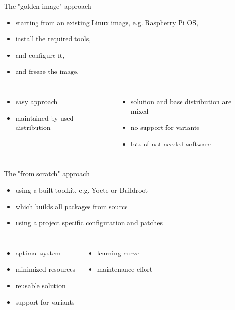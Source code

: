 \documentclass{beamer}
\newcommand\pro{\item[$+$]}
\newcommand\con{\item[$-$]}
\begin{document}
\begin{frame}{The "golden image" approach}
	\begin{itemize}
		\item starting from an existing Linux image, e.g. Raspberry Pi OS,
		\item install the required tools,
		\item and configure it,
		\item and freeze the image.
	\end{itemize}

	\begin{columns}
        \centering
        \begin{itemize}
			\pro easy approach
			\pro maintained by used distribution
		\end{itemize}        
        \centering
        \begin{itemize}
        		\con solution and base distribution are mixed
        		\con no support for variants
        		\con lots of not needed software
        \end{itemize}
    \end{columns}
\end{frame}

\begin{frame}{The "from scratch" approach}
	\begin{itemize}
		\item using a built toolkit, e.g. Yocto or Buildroot
		\item which builds all packages from source
		\item using a project specific configuration and patches
	\end{itemize}

	\begin{columns}
        \centering
        \begin{itemize}
        	\pro optimal system
        	\pro minimized resources
        	\pro reusable solution
        	\pro support for variants
        \end{itemize}
        \centering
        \begin{itemize}
        		\con learning curve
        		\con maintenance effort
        \end{itemize}
    \end{columns}
\end{frame}
\end{document}
